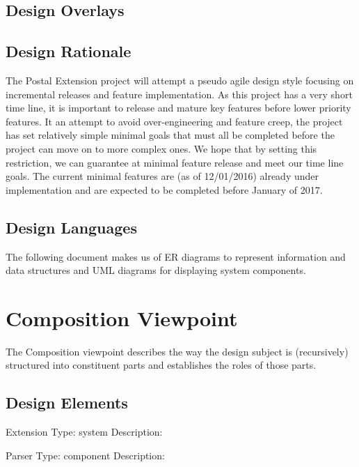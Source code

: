 \documentclass[letterpaper,10pt,titlepage,draftclsnofoot,onecolumn,onesided] {IEEEtran}
\begin{document}
\subsection{Design Overlays}

\subsection{Design Rationale}
The Postal Extension project will attempt a pseudo agile design style focusing on incremental releases and feature implementation.
As this project has a very short time line, it is important to release and mature key features before lower priority features. 
It an attempt to avoid over-engineering and feature creep, the project has set relatively simple minimal goals that must all be completed before the project can move on to more complex ones.
We hope that by setting this restriction, we can guarantee at minimal feature release and meet our time line goals.
The current minimal features are (as of 12/01/2016) already under implementation and are expected to be completed before January of 2017.


\subsection{Design Languages}
The following document makes us of ER diagrams to represent information and data structures and UML diagrams for displaying system components. 






\section{Composition Viewpoint}
The Composition viewpoint describes the way the design subject is (recursively) structured into constituent
parts and establishes the roles of those parts. 
\subsection{Design Elements}
	Extension
	Type: system
	Description:
	
	Parser
	Type: component
	Description:
		
	
\end{document}
